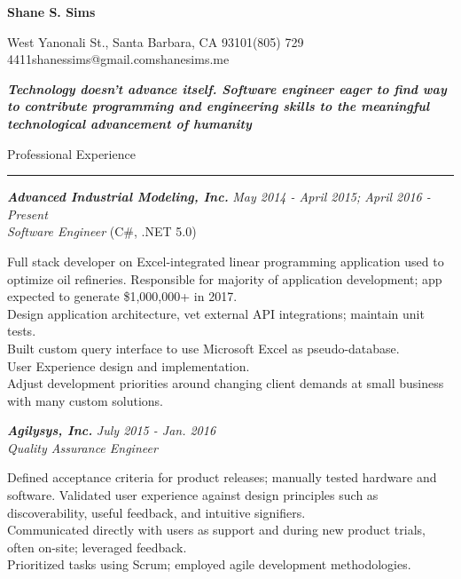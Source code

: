 \documentclass[10pt]{article}
\newcommand{\simsbullet}{{\raisebox{2pt}{\tiny $\bullet$}}\hspace{8pt}}
\newcommand{\midlinesimsbullet}{\hspace{4pt}{\raisebox{2pt}{\tiny $\bullet$}}\hspace{5pt}}
\begin{document}

{\centerline{\huge\bf\sffamily Shane S. Sims}}
\vskip 8pt
{\centerline{ West Yanonali St., Santa Barbara, CA 93101{\midlinesimsbullet}(805) 729 4411{\midlinesimsbullet}shanessims@gmail.com{\midlinesimsbullet}shanesims.me}}

\vskip 12pt

{\bf\it Technology doesn't advance itself. Software engineer eager to find way to contribute programming and engineering skills to the meaningful technological advancement of humanity}
\vskip 18pt

{\Large\sffamily Professional Experience}
\vskip 2pt
\hrule
\vskip 6pt

{\bfseries\itshape\sffamily Advanced Industrial Modeling, Inc.} \hfill \textsf{\textit{May 2014 - April 2015; April 2016 - Present}} \\
\textit{\textsf{Software Engineer}} (C\#, .NET 5.0)
\vskip 4pt

\setlength{\leftskip}{16pt}

Full stack developer on Excel-integrated linear programming application used to optimize oil refineries. 
\vskip 4pt
\simsbullet Responsible for majority of application development; app expected to generate \$1,000,000+ in 2017.\\
\simsbullet Design application architecture, vet external API integrations; maintain unit tests. \\
\simsbullet Built custom query interface to use Microsoft Excel as pseudo-database. \\
\simsbullet User Experience design and implementation. \\
\simsbullet Adjust development priorities around changing client demands at small business with many custom solutions. 

\setlength{\leftskip}{0pt}

\vskip 16pt

{\bfseries\itshape\sffamily Agilysys, Inc.} \hfill \textsf{\textit{July 2015 - Jan. 2016}} \\
\textit{\textsf{Quality Assurance Engineer}}
\vskip 4pt

\setlength{\leftskip}{16pt}

Defined acceptance criteria for product releases; manually tested hardware and software.
\vskip 4pt
\simsbullet Validated user experience against design principles such as discoverability, useful feedback, and intuitive signifiers. \\
\simsbullet Communicated directly with users as support and during new product trials, often on-site; leveraged feedback. \\
\simsbullet Prioritized tasks using Scrum; employed agile development methodologies.
\end{document}

